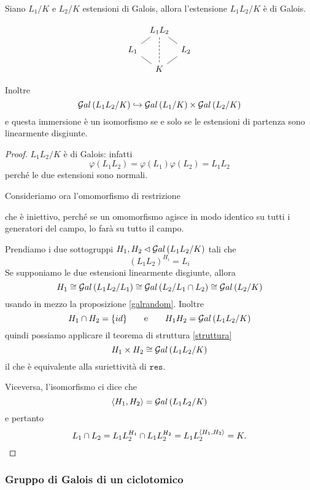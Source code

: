 \begin{multicols}{2}
	\begin{theorem}
		Siano $ L_1/K $ e $ L_2/K $ estensioni di Galois, allora l'estensione $ L_1L_2/K $ è di Galois. 
		
		\[\begin{tikzcd}[row sep=0.25cm, column sep=0.2cm]
		& L_1L_2 \arrow[dl,-] \arrow[dr,-] \arrow[dd, -, dashed] &  \\
		L_1 \arrow[dr,-] &  & L_2 \arrow [dl,-] \\
		& K &
		\end{tikzcd} \]
		
		Inoltre \[ \mathcal{G}al\left( L_1L_2/K \right) \hookrightarrow \mathcal{G}al\left( L_1/K \right) \times \mathcal{G}al\left( L_2/K \right) \]
		e questa immersione è un isomorfismo se e solo se le estensioni di partenza sono linearmente disgiunte.
	\end{theorem}
	
	\begin{proof}
		$ L_1L_2/K $ è di Galois: infatti $$  \varphi(L_1L_2) = \varphi(L_1)\varphi(L_2) = L_1L_2  $$ perché le due estensioni sono normali.
		
		Consideriamo ora l'omomorfismo di restrizione
		
		che è iniettivo, perché se un omomorfismo agisce in modo identico su tutti i generatori del campo, lo farà su tutto il campo.
	
	Prendiamo i due sottogruppi $ H_1, H_2 \lhd \mathcal{G}al\left( L_1L_2 /K \right) $ tali che
	\[ (L_1L_2)^{H_i} = L_i \]
	Se supponiamo le due estensioni linearmente disgiunte, allora
	\[ H_1 \cong \mathcal{G}al\left( L_1L_2/L_1 \right) \cong \mathcal{G}al\left( L_2/L_1 \cap L_2 \right) \cong \mathcal{G}al\left( L_2/K \right)  \]
	usando in mezzo la proposizione \ref{galrandom}. Inoltre
	\[ H_1 \cap H_2 = \{ id \} \qquad\text{e}\qquad H_1H_2 = \mathcal{G}al\left( L_1L_2 /K \right) \]
	quindi possiamo applicare il teorema di struttura \ref{struttura}
	\[ H_1 \times H_2 \cong \mathcal{G}al\left( L_1L_2/K \right) \]
	il che è equivalente alla suriettività di $ \texttt{res} $.
	
	Viceversa, l'isomorfismo ci dice che
	$$  \langle H_1, H_2 \rangle = \mathcal{G}al\left( L_1L_2/K \right)  $$
	e pertanto
	$$ L_1 \cap L_2 = L_1L_2^{H_1} \cap L_1L_2^{H_2} = L_1L_2^{\langle H_1, H_2 \rangle} = K. $$

\end{proof}
	
	\subsubsection{Gruppo di Galois di un ciclotomico}
	

\end{multicols}
